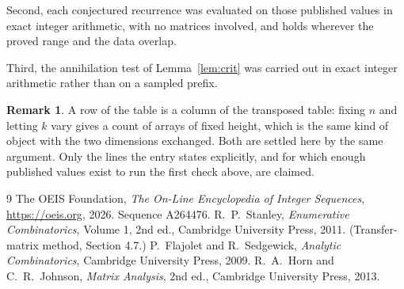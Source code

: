 \documentclass[11pt,a4paper]{article}
\theoremstyle{plain}
\theoremstyle{definition}
\newtheorem{remark}[theorem]{Remark}
\begin{document}
Second, each conjectured recurrence was evaluated on those published values in exact
integer arithmetic, with no matrices involved, and holds wherever the proved range and the
data overlap.

Third, the annihilation test of Lemma~\ref{lem:crit} was carried out in exact integer
arithmetic rather than on a sampled prefix.

\begin{remark}
A row of the table is a column of the transposed table: fixing $n$ and letting $k$ vary gives a
count of arrays of fixed height, which is the same kind of object with the two dimensions
exchanged. Both are settled here by the same argument. Only the lines the entry states
explicitly, and for which enough published values exist to run the first check above, are
claimed.
\end{remark}

\begin{thebibliography}{9}
 The OEIS Foundation, \emph{The On-Line Encyclopedia of Integer
Sequences}, \url{https://oeis.org}, 2026. Sequence A264476.
 R.~P.~Stanley, \emph{Enumerative Combinatorics}, Volume 1, 2nd ed.,
Cambridge University Press, 2011. (Transfer-matrix method, Section 4.7.)
 P.~Flajolet and R.~Sedgewick, \emph{Analytic Combinatorics}, Cambridge
University Press, 2009.
 R.~A.~Horn and C.~R.~Johnson, \emph{Matrix Analysis}, 2nd ed., Cambridge
University Press, 2013.
\end{thebibliography}
\end{document}

